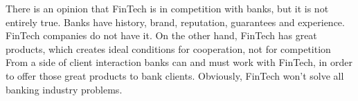 There is an opinion that FinTech is in competition with banks, but it is not entirely true.
Banks have history, brand, reputation, guarantees and experience.
FinTech companies do not have it.
On the other hand, FinTech has great products, which creates ideal conditions for cooperation, not for competition
From a side of client interaction banks can and must work with FinTech, in order to offer those great products to bank clients.
Obviously, FinTech won't solve all banking industry problems.
